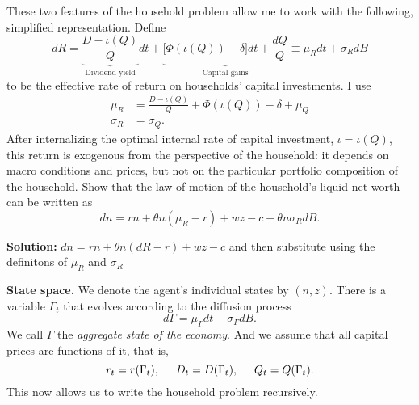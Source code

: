 \documentclass[11pt]{extarticle}
\theoremstyle{plain}
\theoremstyle{definition}
\begin{document}
\begin{enumerate}[(a)]
These two features of the household problem allow me to work with the following, simplified representation. Define 
\begin{equation*}
	dR = \underbrace{\frac{D - \iota (Q) }{Q}}_\text{Dividend yield} dt + \underbrace{\Big[\Phi(\iota(Q)) - \delta \Big] dt +  \frac{dQ}{Q}}_\text{Capital gains} \equiv \mu_R dt + \sigma_R dB
\end{equation*}
to be the effective rate of return on households' capital investments. I use 
\begin{align*}
	\mu_R &= \frac{D - \iota (Q) }{Q}  + \Phi(\iota(Q)) - \delta + \mu_Q \\
	\sigma_R &= \sigma_Q. 
\end{align*}
After internalizing the optimal internal rate of capital investment, $\iota = \iota(Q)$, this return is exogenous from the perspective of the household: it depends on macro conditions and prices, but not on the particular portfolio composition of the household. Show that  the law of motion of the household's liquid net worth 
can be written as 
\begin{equation*}
	dn = rn + \theta n (\mu_R - r) + wz - c + \theta n \sigma_R dB. 
\end{equation*}

\textbf{Solution:}
 $dn = rn + \theta n (dR - r) + wz - c$ and then substitute using the definitons of $\mu_R$ and $\sigma_R$



\vspace{5mm}
\noindent
\textbf{State space.} We denote the agent's individual states by $(n, z)$. There is a variable $\Gamma_t$ that evolves according to the diffusion process 
\begin{equation*}
	d \Gamma = \mu_\Gamma dt + \sigma_\Gamma dB.
\end{equation*}
We call $\Gamma$ the \textit{aggregate state of the economy}. And we assume that all capital prices are functions of it, that is, 
\begin{equation*}
	r_t = r(\Gamma_t), \hspace{5mm}	D_t = D(\Gamma_t), \hspace{5mm}	Q_t = Q(\Gamma_t).
\end{equation*}
This now allows us to write the household problem recursively.



\end{enumerate}
\end{document}
